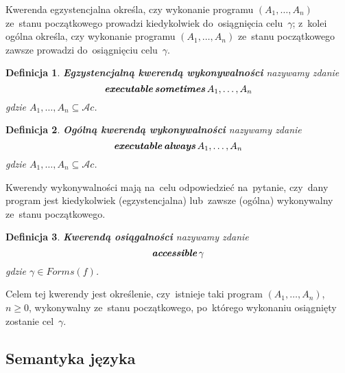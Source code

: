 \documentclass[11pt,a4paper]{article}
\newtheorem{defn}{Definicja}
\DeclareMathOperator{\Always}{\textbf{\textit{always}}}
\DeclareMathOperator{\Sometimes}{\textbf{\textit{sometimes}}}
\DeclareMathOperator{\Executable}{\textbf{\textit{executable}}}
\DeclareMathOperator{\Accessible}{\textbf{\textit{accessible}}}
\begin{document}
    Kwerenda egzystencjalna określa, czy wykonanie programu $(A_1, \dots, A_n)$ ze~stanu początkowego prowadzi kiedykolwiek do~osiągnięcia celu~$\gamma$; z~kolei ogólna określa, czy wykonanie programu $(A_1, \dots, A_n)$ ze~stanu początkowego zawsze prowadzi do~osiągnięciu celu~$\gamma$.

    \begin{defn}
        \textbf{Egzystencjalną kwerendą wykonywalności} nazywamy zdanie
        $$ \Executable \Sometimes A_1, \dots, A_n $$
        gdzie $A_1, \dots, A_n \subseteq \mathcal{A}c$.
    \end{defn}

    \begin{defn}
        \textbf{Ogólną kwerendą wykonywalności} nazywamy zdanie
        $$ \Executable \Always A_1, \dots, A_n $$
        gdzie $A_1, \dots, A_n \subseteq \mathcal{A}c$.
    \end{defn}

    Kwerendy wykonywalności mają na~celu odpowiedzieć na~pytanie, czy~dany program jest kiedykolwiek (egzystencjalna) lub~zawsze (ogólna) wykonywalny ze~stanu początkowego.

    \begin{defn}
        \textbf{Kwerendą osiągalności} nazywamy zdanie
        $$ \Accessible \gamma $$
        gdzie $\gamma \in Forms(f)$.
    \end{defn}
    
    Celem tej kwerendy jest określenie, czy~istnieje taki program $(A_1, \dots, A_n)$, $n \geq 0$, wykonywalny ze~stanu początkowego, po~którego wykonaniu osiągnięty zostanie cel~$\gamma$.

\subsection{Semantyka języka}
\label{subsec:query-semantics}
\end{document}
